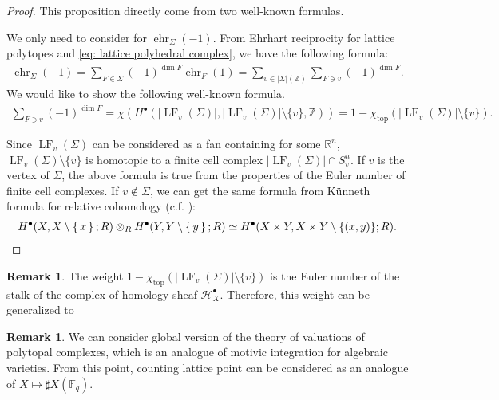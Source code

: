 \documentclass[a4paper,dvipdfmx,reqno,12pt]{amsart}
\theoremstyle{definition}
\newtheorem{Rmk}[Thm]{Remark}
\newcommand{\R}{\mathbb{R}}%
\newcommand{\Z}{\mathbb{Z}}%
\newcommand{\mb}[1]{\mathbb{#1}}%
\newcommand{\mcal}[1]{\mathcal{#1}}%
\newcommand{\opn}[1]{\operatorname{#1}}
\numberwithin{equation}{section}
\begin{document}
\begin{proof}
  This proposition directly come from two well-known formulas.

  We only need to consider for $\opn{ehr}_{\Sigma}(-1)$.
  From Ehrhart reciprocity for lattice polytopes and \cref{eq: lattice polyhedral complex},
  we have the following formula:
  \begin{align}
    \opn{ehr}_{\Sigma}(-1)=\sum_{F\in \Sigma}(-1)^{\dim F}\opn{ehr}_{F}(1)=
    \sum_{v\in |\Sigma|(\Z)}\sum_{ F\ni v}(-1)^{\dim F}.
  \end{align}
  We would like to show the following well-known formula.
  \begin{align}
    \sum_{F\ni v}(-1)^{\dim F}
    =\chi(H^{\bullet}(|\opn{LF}_v(\Sigma)|,|\opn{LF}_v(\Sigma)|\setminus \{v\},\Z))
    =1-\chi_{\opn{top}}(|\opn{LF}_v(\Sigma)|\setminus \{v\}).
  \end{align}



  Since $\opn{LF}_v(\Sigma)$ can be considered as a fan
  containing for some $\R^{n}$, $\opn{LF}_v(\Sigma)\setminus \{v\}$
  is homotopic to a finite cell complex $|\opn{LF}_v(\Sigma)|\cap S^{n}_v$.
  If $v$ is the vertex of $\Sigma$, the above formula is true from the properties of
  the Euler number of finite cell complexes.
  If $v \notin \Sigma$,
  we can get the same formula
  from K\"unneth formula for relative cohomology (c.f. \cite[Theorem 3.18]{hatcherAlgebraicTopology2002a}):
  \begin{align}H^{\bullet}(X,X\setminus \set{x};R)
    \otimes_{R} H^{\bullet}(Y,Y\setminus \set{y};R)\simeq H^{\bullet}(X\times Y,X\times Y \setminus \{(x,y)\};R).
  \end{align}



\end{proof}

\begin{Rmk}
  The weight $1-\chi_{\opn{top}}(|\opn{LF}_v(\Sigma)|\setminus \{v\})$
  is the Euler number of the stalk of the complex of homology sheaf
  $\mcal{H}_X^{\bullet}$. Therefore, this weight can be generalized
  to
\end{Rmk}


\begin{Rmk}
  We can consider global version of the theory of valuations of polytopal
  complexes, which is an analogue of motivic integration for algebraic
  varieties. From this point, counting lattice point can be
  considered as an analogue of $X\mapsto \sharp X(\mb{F}_q)$.
\end{Rmk}
\end{document}
